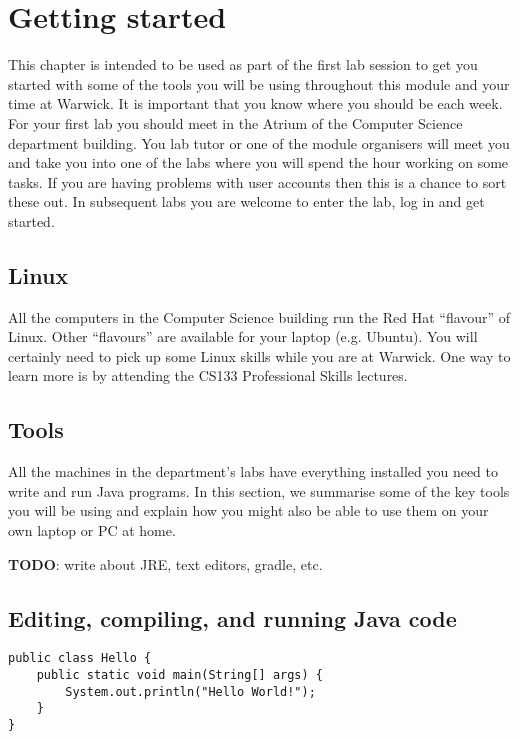 \pagebreak
\section{Getting started}

This chapter is intended to be used as part of the first lab session to get you started with some of the tools you will be using throughout this module and your time at Warwick. It is important that you know where you should be each week. For your first lab you should meet in the Atrium of the Computer Science department building. You lab tutor or one of the module organisers will meet you and take you into one of the labs where you will spend the hour working on some tasks. If you are having problems with user accounts then this is a chance to sort these out. In subsequent labs you are welcome to enter the lab, log in and get started.

\subsection{Linux}

All the computers in the Computer Science building run the Red Hat ``flavour'' of Linux. Other ``flavours'' are available for
your laptop (e.g. Ubuntu). You will certainly need to pick up some Linux skills while you are at Warwick. One way to learn more is by attending the CS133 Professional Skills lectures.

\subsection{Tools}

All the machines in the department's labs have everything installed you need to write and run Java programs. In this section, we summarise some of the key tools you will be using and explain how you might also be able to use them on your own laptop or PC at home.

\textbf{TODO}: write about JRE, text editors, gradle, etc.

\subsection{Editing, compiling, and running Java code}


\begin{verbatim}
public class Hello { 
    public static void main(String[] args) {
        System.out.println("Hello World!");
    }
}
\end{verbatim}


